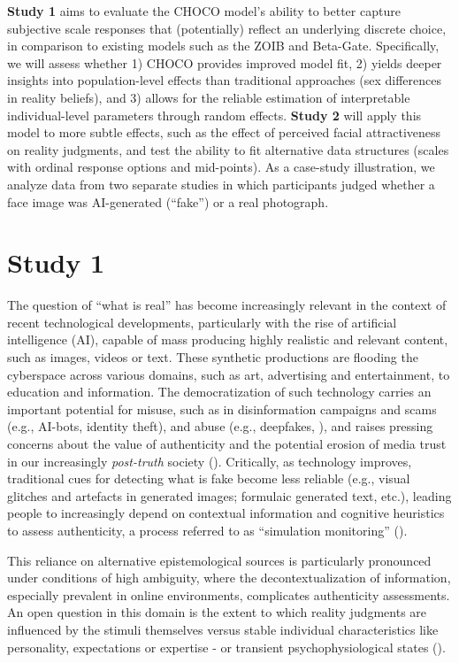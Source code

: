 \documentclass[
  jou,
  floatsintext,
  longtable,
  nolmodern,
  notxfonts,
  notimes,
  colorlinks=true,linkcolor=blue,citecolor=blue,urlcolor=blue]{apa7}
\begin{document}
\textbf{Study 1} aims to evaluate the CHOCO model's ability to better
capture subjective scale responses that (potentially) reflect an
underlying discrete choice, in comparison to existing models such as the
ZOIB and Beta-Gate. Specifically, we will assess whether 1) CHOCO
provides improved model fit, 2) yields deeper insights into
population-level effects than traditional approaches (sex differences in
reality beliefs), and 3) allows for the reliable estimation of
interpretable individual-level parameters through random effects.
\textbf{Study 2} will apply this model to more subtle effects, such as
the effect of perceived facial attractiveness on reality judgments, and
test the ability to fit alternative data structures (scales with ordinal
response options and mid-points). As a case-study illustration, we
analyze data from two separate studies in which participants judged
whether a face image was AI-generated (``fake'') or a real photograph.

\section{Study 1}\label{study-1}

The question of ``what is real'' has become increasingly relevant in the
context of recent technological developments, particularly with the rise
of artificial intelligence (AI), capable of mass producing highly
realistic and relevant content, such as images, videos or text. These
synthetic productions are flooding the cyberspace across various
domains, such as art, advertising and entertainment, to education and
information. The democratization of such technology carries an important
potential for misuse, such as in disinformation campaigns and scams
(e.g., AI-bots, identity theft), and abuse (e.g., deepfakes,
), and raises
pressing concerns about the value of authenticity and the potential
erosion of media trust in our increasingly \emph{post-truth} society
().
Critically, as technology improves, traditional cues for detecting what
is fake become less reliable (e.g., visual glitches and artefacts in
generated images; formulaic generated text, etc.), leading people to
increasingly depend on contextual information and cognitive heuristics
to assess authenticity, a process referred to as ``simulation
monitoring'' ().

This reliance on alternative epistemological sources is particularly
pronounced under conditions of high ambiguity, where the
decontextualization of information, especially prevalent in online
environments, complicates authenticity assessments. An open question in
this domain is the extent to which reality judgments are influenced by
the stimuli themselves versus stable individual characteristics like
personality, expectations or expertise - or transient
psychophysiological states ().
\end{document}
